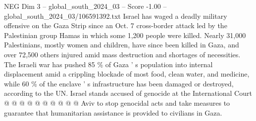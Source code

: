 \begin{textsample}{NEG Dim 3 – global\_south\_2024\_03 – Score -1.00 – global\_south\_2024\_03/106591392.txt}
Israel has waged a deadly military offensive on the Gaza Strip since an Oct. 7 cross-border attack led by the Palestinian group Hamas in which some 1,200 people were killed.
Nearly 31,000 Palestinians, mostly women and children, have since been killed in Gaza, and over 72,500 others injured amid mass destruction and shortages of necessities.
The Israeli war has pushed 85 \% of Gaza ' s population into internal displacement amid a crippling blockade of most food, clean water, and medicine, while 60 \% of the enclave ' s infrastructure has been damaged or destroyed, according to the UN.
Israel stands accused of genocide at the International Court @ @ @ @ @ @ @ @ @ @ Aviv to stop genocidal acts and take measures to guarantee that humanitarian assistance is provided to civilians in Gaza.

\end{textsample}
